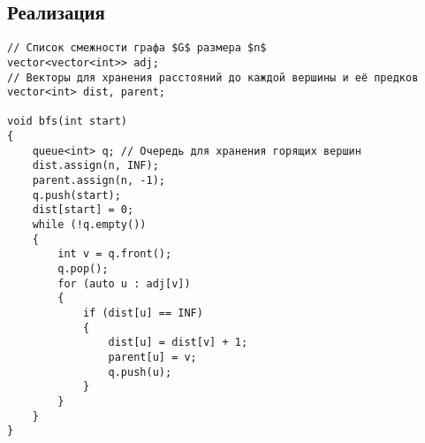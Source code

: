 \subsection{Реализация}

\begin{verbatim}
// Список смежности графа $G$ размера $n$
vector<vector<int>> adj;
// Векторы для хранения расстояний до каждой вершины и её предков
vector<int> dist, parent;

void bfs(int start)
{
    queue<int> q; // Очередь для хранения горящих вершин
    dist.assign(n, INF);
    parent.assign(n, -1);
    q.push(start);
    dist[start] = 0;
    while (!q.empty())
    {
        int v = q.front();
        q.pop();
        for (auto u : adj[v])
        {
            if (dist[u] == INF)
            {
                dist[u] = dist[v] + 1;
                parent[u] = v;
                q.push(u);
            }
        }
    }
}
\end{verbatim}

